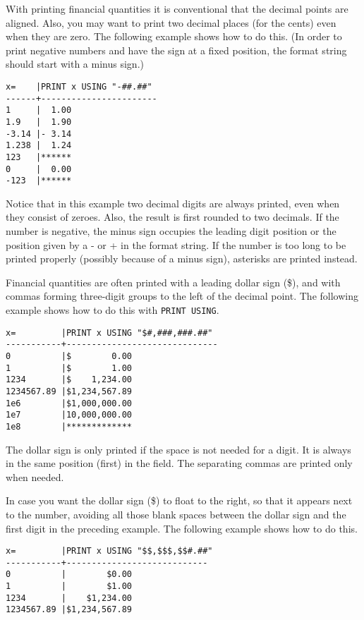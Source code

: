 With printing financial quantities it is conventional that the decimal points 
are aligned. Also, you may want to print two decimal places (for the cents) even
when they are zero. The following
 example shows how to do this. (In
order to print negative numbers and have the sign at a fixed position, the 
format string should start with a minus sign.)

\begin{verbatim}
x=    |PRINT x USING "-##.##"
------+-----------------------
1     |  1.00
1.9   |  1.90
-3.14 |- 3.14
1.238 |  1.24
123   |******
0     |  0.00
-123  |******
\end{verbatim}

Notice that in this example two decimal digits are always printed, even when
they consist of zeroes. Also, the result is first rounded to two decimals. If
the number is negative, the minus sign occupies the leading digit position or
the position given by a - or + in the format string. If the number is too long
to be printed properly (possibly because of a minus sign), asterisks are printed
instead.

Financial quantities are often printed with a leading dollar sign (\$), and 
with commas forming three-digit groups to the left of the decimal point. The 
following example shows how to do this with \verb|PRINT USING|.

\begin{verbatim}
x=         |PRINT x USING "$#,###,###.##"
-----------+------------------------------
0          |$        0.00
1          |$        1.00
1234       |$    1,234.00
1234567.89 |$1,234,567.89
1e6        |$1,000,000.00
1e7        |10,000,000.00
1e8        |*************
\end{verbatim}

The dollar sign is only printed if the space is not needed for a digit. It is
always in the same position (first) in the field. The separating commas are
printed only when needed.

In case you want the dollar sign (\$) to float to the right, so that 
it appears next to the number, avoiding all those blank spaces between the 
dollar sign and the first digit in the preceding example. The following 
example shows how to do this.

\begin{verbatim}
x=         |PRINT x USING "$$,$$$,$$#.##"
-----------+----------------------------
0          |        $0.00
1          |        $1.00
1234       |    $1,234.00
1234567.89 |$1,234,567.89
\end{verbatim}

